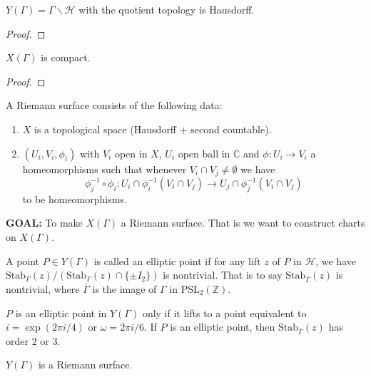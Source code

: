 \documentclass[oneside, 12pt]{scrbook}
\newcommand{\CC}{\mathbb C}
\newcommand{\ZZ}{\mathbb Z}
\newcommand{\bs}{\backslash}
\newcommand{\Stab}{\mathrm{Stab}}
\newcommand{\Hh}{\mathcal{H}}
\theoremstyle{theorem}
\begin{document}
\begin{corollary}
$Y(\Gamma) = \Gamma \bs \Hh$ with the quotient topology is Hausdorff.
\end{corollary}

\begin{proof}

\end{proof}

\begin{proposition}
$X(\Gamma)$ is compact.
\end{proposition}

\begin{proof}

\end{proof}



\begin{definition}
A Riemann surface consists of the following data: 
\begin{enumerate}
\item $X$ is a topological space (Hausdorff + second countable).
\item $(U_{i},V_{i}, \phi_{i})$ with $V_{i}$ open in $X$, $U_{i}$ open ball in $\CC$ and $\phi: U_{i} \rightarrow V_{i}$ a homeomorphisms such that whenever $V_{i} \cap V_{j} \neq \emptyset$ we have $$\phi_{j}^{-1} \circ \phi_{i} : U_{i} \cap \phi_{i}^{-1}(V_{i} \cap V_{j}) \rightarrow U_{j} \cap \phi_{j}^{-1} (V_{i} \cap V_{j})$$ to be homeomorphisms. 
\end{enumerate}
\end{definition}

\textbf{\textcolor{BrickRed}{GOAL}:} To make $X(\Gamma)$ a Riemann surface. That is we want to construct charts on $X(\Gamma)$.

\begin{definition}
A point $P \in Y(\Gamma)$ is called an elliptic point if for any lift $z$ of $P$ in $\Hh$, we have $\Stab_{\Gamma}(z) / \left(  \Stab_{\Gamma}(z) \cap \{\pm I_{2}\} \right)$ is nontrivial. That is to say $\Stab_{\bar{\Gamma}}(z)$ is nontrivial, where $\bar{\Gamma}$ is the image of $\Gamma$ in $\mathrm{PSL}_{2}(\ZZ)$.
\end{definition}

$P$ is an elliptic point in $Y(\Gamma)$ only if it lifts to a point equivalent to $i = \exp(2 \pi i /4)$ or $\omega  = 2 \pi  i /6$. If $P$ is an elliptic point, then $\Stab_{\bar{\Gamma}}(z)$ has order $2$ or $3$.

\begin{theorem}
$Y(\Gamma)$ is a Riemann surface.
\end{theorem} 
\end{document}
